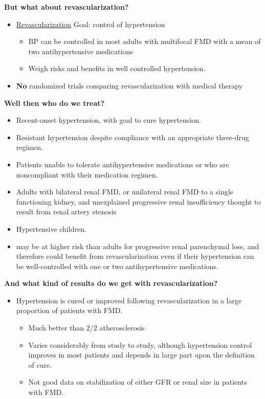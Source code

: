\documentclass[
]{book}
\begin{document}
\textbf{But what about revascularization?}

\begin{itemize}
\item
  \underline{Revascularization} Goal: control of hypertension

  \begin{itemize}
  \item
    BP can be controlled in most adults with multifocal FMD with a
    mean of two antihypertensive medications
  \item
    Weigh risks and benefits in well controlled hypertension.
  \end{itemize}
\item
  \textbf{No} randomized trials comparing revascularization with medical
  therapy
\end{itemize}

\textbf{Well then who do we treat?}

\begin{itemize}
\item
  Recent-onset hypertension, with goal to cure hypertension.
\item
  Resistant hypertension despite compliance with an appropriate
  three-drug regimen.
\item
  Patients unable to tolerate antihypertensive medications or who are
  noncompliant with their medication regimen.
\item
  Adults with bilateral renal FMD, or unilateral renal FMD to a single
  functioning kidney, and unexplained progressive renal insufficiency
  thought to result from renal artery stenosis
\item
  Hypertensive children.
\item
  may be at higher risk than adults for progressive renal parenchymal
  loss, and therefore could benefit from revascularization even if
  their hypertension can be well-controlled with one or two
  antihypertensive medications.
\end{itemize}

\textbf{And what kind of results do we get with revascularization?}

\begin{itemize}
\item
  Hypertension is cured or improved following revascularization in a
  large proportion of patients with FMD.

  \begin{itemize}
  \item
    Much better than 2/2 atherosclerosis
  \item
    Varies considerably from study to study, although hypertension
    control improves in most patients and depends in large part upon
    the definition of cure.
  \item
    Not good data on stabilization of either GFR or renal size in
    patients with FMD.
  \end{itemize}
\end{itemize}
\end{document}
